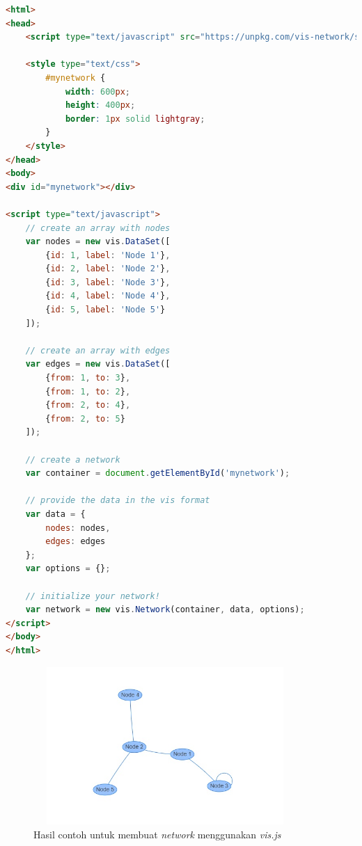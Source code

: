 \begin{lstlisting}[language=HTML, caption=Contoh kode untuk membuat \textit{network} menggunakan \textit{vis.js}\label{lst:kodeNetwork}]
<html>
<head>
    <script type="text/javascript" src="https://unpkg.com/vis-network/standalone/umd/vis-network.min.js"></script>

    <style type="text/css">
        #mynetwork {
            width: 600px;
            height: 400px;
            border: 1px solid lightgray;
        }
    </style>
</head>
<body>
<div id="mynetwork"></div>

<script type="text/javascript">
    // create an array with nodes
    var nodes = new vis.DataSet([
        {id: 1, label: 'Node 1'},
        {id: 2, label: 'Node 2'},
        {id: 3, label: 'Node 3'},
        {id: 4, label: 'Node 4'},
        {id: 5, label: 'Node 5'}
    ]);

    // create an array with edges
    var edges = new vis.DataSet([
        {from: 1, to: 3},
        {from: 1, to: 2},
        {from: 2, to: 4},
        {from: 2, to: 5}
    ]);

    // create a network
    var container = document.getElementById('mynetwork');

    // provide the data in the vis format
    var data = {
        nodes: nodes,
        edges: edges
    };
    var options = {};

    // initialize your network!
    var network = new vis.Network(container, data, options);
</script>
</body>
</html>
\end{lstlisting}

\begin{figure}[H]
    \centering
    \includegraphics[width=10cm, height=6cm]{Gambar/hasilNetwork.jpg}
    \caption{Hasil contoh untuk membuat \textit{network} menggunakan \textit{vis.js}}
    \label{fig:gambarHasilNetwork}
\end{figure}

